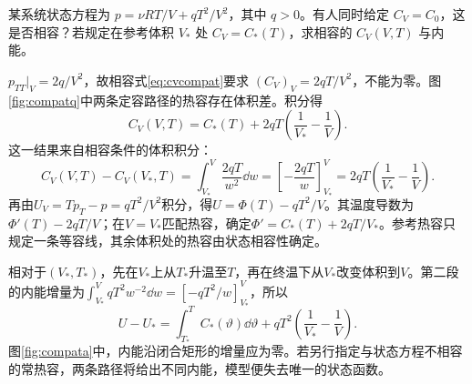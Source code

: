 \begin{example}[状态方程与热容的相容性]
某系统状态方程为 $p=\nu RT/V+qT^2/V^2$，其中 $q>0$。有人同时给定 $C_V=C_0$，这是否相容？若规定在参考体积 $V_*$ 处 $C_V=C_*(T)$，求相容的 $C_V(V,T)$ 与内能。
\end{example}
\begin{solution}
$p_{TT}|_V=2q/V^2$，故相容式\eqref{eq:cvcompat}要求 $(C_V)_V=2qT/V^2$，不能为零。图\ref{fig:compatq}中两条定容路径的热容存在体积差。积分得
\[
 C_V(V,T)=C_*(T)+2qT\left(\frac1{V_*}-\frac1V\right).
\]
这一结果来自相容条件的体积积分：
\[
 C_V(V,T)-C_V(V_*,T)
 =\int_{V_*}^{V}\frac{2qT}{w^2}\dd w
 =\left[-\frac{2qT}{w}\right]_{V_*}^{V}
 =2qT\left(\frac1{V_*}-\frac1V\right).
\]
再由$U_V=Tp_T-p=qT^2/V^2$积分，得$U=\Phi(T)-qT^2/V$。其温度导数为$\Phi'(T)-2qT/V$；在$V=V_*$匹配热容，确定$\Phi'=C_*(T)+2qT/V_*$。参考热容只规定一条等容线，其余体积处的热容由状态相容性确定。

相对于$(V_*,T_*)$，先在$V_*$上从$T_*$升温至$T$，再在终温下从$V_*$改变体积到$V$。第二段的内能增量为$\int_{V_*}^VqT^2w^{-2}\dd w=[-qT^2/w]_{V_*}^V$，所以
\[
 U-U_*=\int_{T_*}^{T}C_*(\vartheta)\dd\vartheta
 +qT^2\left(\frac1{V_*}-\frac1V\right).
\]
图\ref{fig:compata}中，内能沿闭合矩形的增量应为零。若另行指定与状态方程不相容的常热容，两条路径将给出不同内能，模型便失去唯一的状态函数。
\end{solution}




